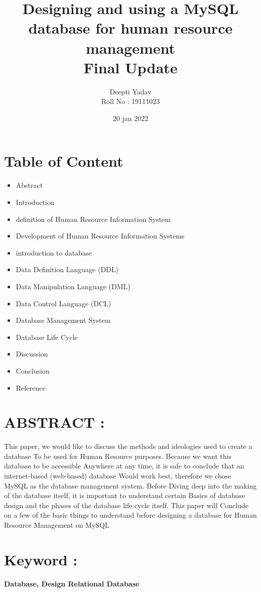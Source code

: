 \documentclass[12pt,a4paper]{article}
\title{Designing and using a MySQL database for human resource management \\ Final Update}
\date{20 jan 2022}
\author{Deepti Yadav \\ Roll No : 19111023 }
\begin{document}
\maketitle
\section*{Table of Content}
\begin{itemize}
    \item Abstract
\item Introduction
\item definition of Human Resource Information System
\item Development of Human Resource Information Systems
\item introduction to database
\item Data Definition Language (DDL)
\item Data Manipulation Language (DML)
\item Data Control Language (DCL)
\item Database Management System
\item Database Life Cycle 
\item Discussion
\item Conclusion
\item Reference
\end{itemize}
\section*{ABSTRACT : }This paper, we would like to discuss the methods and ideologies used to create a database To be used for Human Resource purposes. Because we want this database to be accessible Anywhere at any time, it is safe to conclude that an internet-based (web-based) database Would work best, therefore we chose MySQL as the database management system. Before Diving deep into the making of the database itself, it is important to understand certain Basics of database design and the phases of the database life cycle itself. 
This paper will Conclude on a few of the basic things to understand before designing a database for Human Resource Management on MySQL
\section*{Keyword : } \textbf{Database, Design Relational Database}
\end{document}
